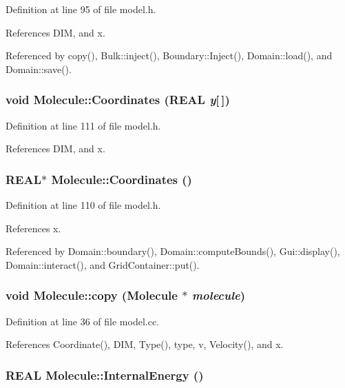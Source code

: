 Definition at line 95 of file model.h.

References DIM, and x.

Referenced by copy(), Bulk::inject(), Boundary::Inject(), Domain::load(), and Domain::save().\hypertarget{classMolecule_a30f81c8d8e9199a6a6fdad9f93d3fef}{
\subsubsection[{Coordinates}]{\setlength{\rightskip}{0pt plus 5cm}void Molecule::Coordinates (REAL {\em y}\mbox{[}$\,$\mbox{]})}}
\label{classMolecule_a30f81c8d8e9199a6a6fdad9f93d3fef}




Definition at line 111 of file model.h.

References DIM, and x.\hypertarget{classMolecule_243725aba0af815b6abadee8c89cb291}{
\subsubsection[{Coordinates}]{\setlength{\rightskip}{0pt plus 5cm}REAL$\ast$ Molecule::Coordinates ()}}
\label{classMolecule_243725aba0af815b6abadee8c89cb291}




Definition at line 110 of file model.h.

References x.

Referenced by Domain::boundary(), Domain::computeBounds(), Gui::display(), Domain::interact(), and GridContainer::put().\hypertarget{classMolecule_ed5cd1c9eb118054e0ed2f058a672676}{
\subsubsection[{copy}]{\setlength{\rightskip}{0pt plus 5cm}void Molecule::copy ({\bf Molecule} $\ast$ {\em molecule})}}
\label{classMolecule_ed5cd1c9eb118054e0ed2f058a672676}




Definition at line 36 of file model.cc.

References Coordinate(), DIM, Type(), type, v, Velocity(), and x.\hypertarget{classMolecule_a9587ec46e840a47f25acc2b9d49b32a}{
\subsubsection[{InternalEnergy}]{\setlength{\rightskip}{0pt plus 5cm}REAL Molecule::InternalEnergy ()}}
\label{classMolecule_a9587ec46e840a47f25acc2b9d49b32a}




